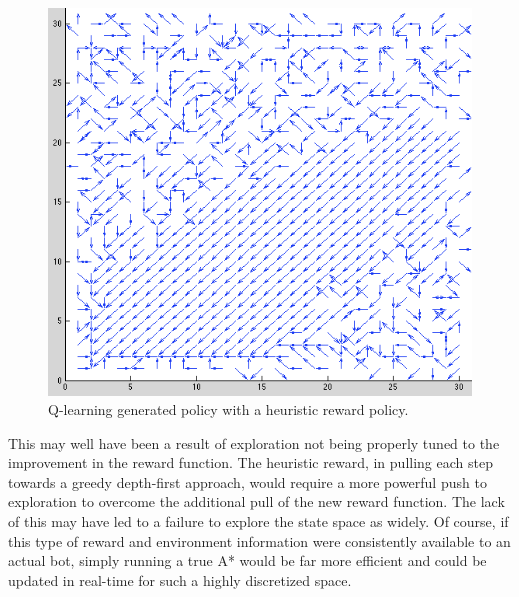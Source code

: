 \documentclass{aiaa-tc}%
\begin{document}
\begin{figure}[htbp]
  \centering
  \includegraphics[width=\linewidth]{images/HeuristicPolicy.png} 
  \caption{Q-learning generated policy with a heuristic reward policy.}
  \label{fig:heuristicQ}
\end{figure}
\clearpage
\noindent
This may well have been a result of exploration
not being properly tuned to the improvement in the reward
function. The heuristic reward, in pulling each step towards a greedy
depth-first approach, would require a more powerful push to exploration
to overcome the additional pull of the new reward function. The lack
of this may have led to a failure to explore
the state space as widely. Of course, if this type
of reward and environment information were consistently available to an actual bot,
simply
running a true A* would be far more
efficient and could be updated in real-time for such a highly discretized
space.
\end{document}
